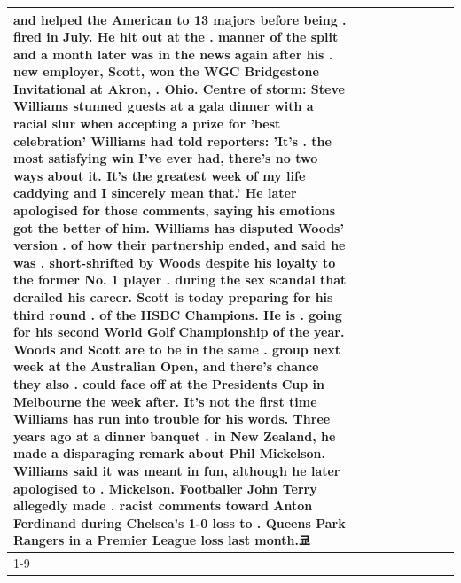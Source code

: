 \begin{table}[H]
\begin{tabular}{lllrlllll}
and helped the American to 13 majors before being . fired in July. He hit out at the . manner of the split and a month later was in the news again after his . new employer, Scott, won the WGC Bridgestone Invitational at Akron, . Ohio. Centre of storm: Steve Williams stunned guests at a gala dinner with a racial slur when accepting a prize for 'best celebration' Williams had told reporters: 'It's . the most satisfying win I've ever had, there's no two ways about it. It's the greatest week of my life caddying and I sincerely mean that.' He later apologised for those comments, saying his emotions got the better of him. Williams has disputed Woods' version . of how their partnership ended, and said he was . short-shrifted by Woods despite his loyalty to the former No. 1 player . during the sex scandal that derailed his career. Scott is today preparing for his third round . of the HSBC Champions. He is . going for his second World Golf Championship of the year. Woods and Scott are to be in the same . group next week at the Australian Open, and there's chance they also . could face off at the Presidents Cup in Melbourne the week after. It's not the first time Williams has run into trouble for his words. Three years ago at a dinner banquet . in New Zealand, he made a disparaging remark about Phil Mickelson. Williams said it was meant in fun, although he later apologised to . Mickelson. Footballer John Terry allegedly made . racist comments toward Anton Ferdinand during Chelsea's 1-0 loss to . Queens Park Rangers in a Premier League loss last month.쿄 \\
\cline{1-9}

\end{tabular}
\end{table}
